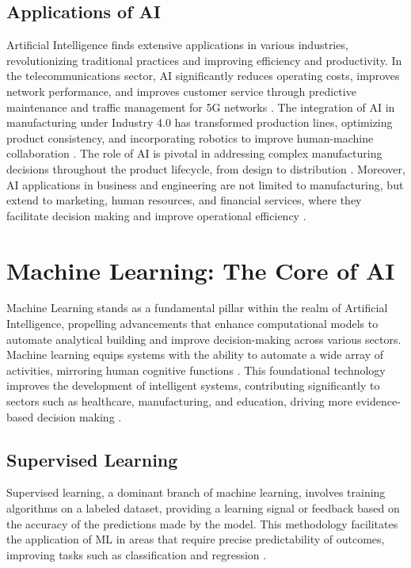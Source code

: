 \subsection{Applications of AI}
Artificial Intelligence finds extensive applications in various industries, revolutionizing traditional practices and improving efficiency and productivity. In the telecommunications sector, AI significantly reduces operating costs, improves network performance, and improves customer service through predictive maintenance and traffic management for 5G networks \cite{balmer2020applications}. The integration of AI in manufacturing under Industry 4.0 has transformed production lines, optimizing product consistency, and incorporating robotics to improve human-machine collaboration \cite{javaid2021applications}. The role of AI is pivotal in addressing complex manufacturing decisions throughout the product lifecycle, from design to distribution \cite{fox1986industrial}. Moreover, AI applications in business and engineering are not limited to manufacturing, but extend to marketing, human resources, and financial services, where they facilitate decision making and improve operational efficiency \cite{bai2011applications}.

\section{Machine Learning: The Core of AI}
\label{sec:ml_core}
Machine Learning stands as a fundamental pillar within the realm of Artificial Intelligence, propelling advancements that enhance computational models to automate analytical building and improve decision-making across various sectors. Machine learning equips systems with the ability to automate a wide array of activities, mirroring human cognitive functions \cite{chakraborty2020machine, janiesch2021machine}. This foundational technology improves the development of intelligent systems, contributing significantly to sectors such as healthcare, manufacturing, and education, driving more evidence-based decision making \cite{jordan2015machine}.

\subsection{Supervised Learning}
Supervised learning, a dominant branch of machine learning, involves training algorithms on a labeled dataset, providing a learning signal or feedback based on the accuracy of the predictions made by the model. This methodology facilitates the application of ML in areas that require precise predictability of outcomes, improving tasks such as classification and regression \cite{Hastie2001}.

